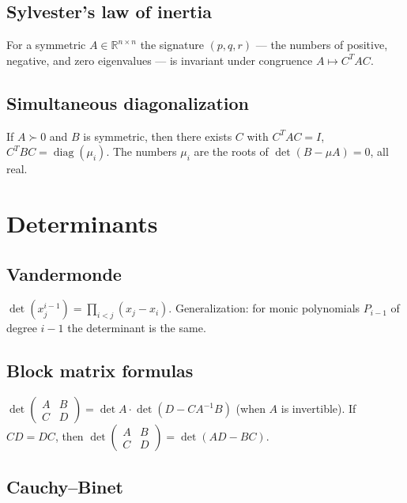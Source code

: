 \subsection{Sylvester's law of inertia}
\label{subsec:sylvester-inertia}

For a symmetric $A\in\mathbb{R}^{n\times n}$ the signature $(p,q,r)$ --- the numbers of positive, negative, and zero eigenvalues --- is invariant under congruence $A\mapsto C^TAC$.

\subsection{Simultaneous diagonalization}
\label{subsec:simultaneous-diagonalization}

If $A\succ0$ and $B$ is symmetric, then there exists $C$ with $C^TAC=I$, $C^TBC=\operatorname{diag}(\mu_i)$. The numbers $\mu_i$ are the roots of $\det(B-\mu A)=0$, all real.

\medskip

\section{Determinants}
\label{sec:determinants}

\subsection{Vandermonde}
\label{subsec:vandermonde}

$\det(x_j^{i-1})=\prod_{i<j}(x_j-x_i)$. Generalization: for monic polynomials $P_{i-1}$ of degree $i-1$ the determinant is the same.

\subsection{Block matrix formulas}
\label{subsec:block-determinants}

$\det\begin{pmatrix}A&B\\ C&D\end{pmatrix}=\det A\cdot\det(D-CA^{-1}B)$ (when $A$ is invertible). If $CD=DC$, then $\det\begin{pmatrix}A&B\\ C&D\end{pmatrix}=\det(AD-BC)$.

\subsection{Cauchy--Binet}
\label{subsec:cauchy-binet}

